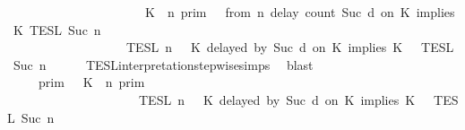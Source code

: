 \begin{isabellebody}
\ \ \ \ \ \ \ \ \ \ \ \ \ \ \ \ \ \ \ \ {\isasymunion}\ {\isacharparenleft}{\isasymlbrakk}\ K\ {\isasymUp}\ n\ {\isasymrbrakk}\isactrlsub p\isactrlsub r\isactrlsub i\isactrlsub m\ {\isasyminter}\ {\isasymlbrakk}\ from\ n\ delay\ count\ {\isacharparenleft}Suc\ d{\isacharparenright}\ on\ K\ implies\ K\ {\isasymrbrakk}\isactrlsub T\isactrlsub E\isactrlsub S\isactrlsub L\isactrlbsup {\isasymge}\ Suc\ n\isactrlesup {\isacharparenright}\isanewline
\ \ \ \ \ \ \ \ \ \ \ \ \ \ \ \ \ \ {\isacharparenright}\isanewline
\ \ \ \ \ \ \ \ \ \ \ \ \ \ \ \ {\isasyminter}\ {\isasymlbrakk}{\isasymlbrakk}\ {\isasymPsi}\ {\isasymrbrakk}{\isasymrbrakk}\isactrlsub T\isactrlsub E\isactrlsub S\isactrlsub L\isactrlbsup {\isasymge}\ n\isactrlesup \ {\isasyminter}\ {\isasymlbrakk}{\isasymlbrakk}\ {\isacharparenleft}K\ delayed\ by\ {\isacharparenleft}Suc\ d{\isacharparenright}\ on\ K\ implies\ K\ {\isacharhash}\ {\isasymPhi}\ {\isasymrbrakk}{\isasymrbrakk}\isactrlsub T\isactrlsub E\isactrlsub S\isactrlsub L\isactrlbsup {\isasymge}\ Suc\ n\isactrlesup {\isacartoucheclose}\isanewline
\ \ \ \ \isamarkupfalse%
\ TESL{\isacharunderscore}interpretation{\isacharunderscore}stepwise{\isachardot}simps{\isacharparenleft}{}{\isacharparenright}\ \isamarkupfalse%
\ blast\isanewline
\ \ \isamarkupfalse%
\ \isamarkupfalse%
\ {\isacartoucheopen}{\isachardot}{\isachardot}{\isachardot}\ {\isacharequal}\ {\isacharparenleft}{\isasymlbrakk}{\isasymlbrakk}\ {\isasymGamma}\ {\isasymrbrakk}{\isasymrbrakk}\isactrlsub p\isactrlsub r\isactrlsub i\isactrlsub m\ {\isasyminter}\ {\isasymlbrakk}\ K\ {\isasymnot}{\isasymUp}\ n\ {\isasymrbrakk}\isactrlsub p\isactrlsub r\isactrlsub i\isactrlsub m\isanewline
\ \ \ \ \ \ \ \ \ \ \ \ \ \ \ \ \ \ {\isasyminter}\ {\isasymlbrakk}{\isasymlbrakk}\ {\isasymPsi}\ {\isasymrbrakk}{\isasymrbrakk}\isactrlsub T\isactrlsub E\isactrlsub S\isactrlsub L\isactrlbsup {\isasymge}\ n\isactrlesup \ {\isasyminter}\ {\isasymlbrakk}{\isasymlbrakk}\ {\isacharparenleft}K\ delayed\ by\ {\isacharparenleft}Suc\ d{\isacharparenright}\ on\ K\ implies\ K\ {\isacharhash}\ {\isasymPhi}\ {\isasymrbrakk}{\isasymrbrakk}\isactrlsub T\isactrlsub E\isactrlsub S\isactrlsub L\isactrlbsup {\isasymge}\ Suc\ n\isactrlesup {\isacharparenright}\isanewline

\end{isabellebody}
